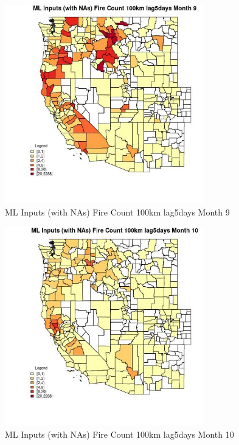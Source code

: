 \begin{figure} 
\centering  
\includegraphics[width=0.77\textwidth]{Code_Outputs/Report_ML_input_PM25_Step4_part_e_de_duplicated_aves_compiled_2019-05-20wNAs_CountyFire_Count_100km_lag5daysmedianMonth9.jpg} 
\caption{\label{fig:Report_ML_input_PM25_Step4_part_e_de_duplicated_aves_compiled_2019-05-20wNAsCountyFire_Count_100km_lag5daysmedianMonth9}ML Inputs (with NAs) Fire Count 100km lag5days Month 9} 
\end{figure} 
 

\begin{figure} 
\centering  
\includegraphics[width=0.77\textwidth]{Code_Outputs/Report_ML_input_PM25_Step4_part_e_de_duplicated_aves_compiled_2019-05-20wNAs_CountyFire_Count_100km_lag5daysmedianMonth10.jpg} 
\caption{\label{fig:Report_ML_input_PM25_Step4_part_e_de_duplicated_aves_compiled_2019-05-20wNAsCountyFire_Count_100km_lag5daysmedianMonth10}ML Inputs (with NAs) Fire Count 100km lag5days Month 10} 
\end{figure} 
 

